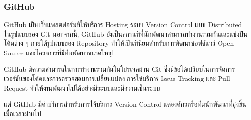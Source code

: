 \documentclass[12pt,oneside,openright,a4paper]{cpe-thai-project}
\begin{document}
        \subsubsection{GitHub}
            \begin{flushleft}
                GitHub เป็นเว็บแพลตฟอร์มที่ให้บริการ Hosting ระบบ Version Control แบบ Distributed ในรูปแบบของ Git นอกจากนี้, GitHub ยังเป็นสถานที่ที่นักพัฒนาสามารถทำงานร่วมกันและแบ่งปันโค้ดต่าง ๆ ภายใต้รูปแบบของ Repository ทำให้เป็นที่นิยมสำหรับการพัฒนาซอฟต์แวร์ Open Source และโครงการที่มีทีมพัฒนาขนาดใหญ่~\cite{github}
            \end{flushleft}
            \begin{flushleft}
                GitHub มีความสามารถในการทำงานร่วมกันในโปรเจคผ่าน Git ซึ่งมีข้อได้เปรียบในการจัดการเวอร์ชันของโค้ดและการตรวจสอบการเปลี่ยนแปลง การให้บริการ Issue Tracking และ Pull Request ทำให้งานพัฒนาไปได้อย่างมีระบบและมีความเป็นระบบ~\cite{github, chacon14}
            \end{flushleft}
            \begin{flushleft}
                แต่ GitHub มีค่าบริการสำหรับการให้บริการ Version Control แด่องค์กรหรือทีมนักพัฒนาที่สูงขึ้นเมื่อเวลาผ่านไป~\cite{githubprice}
            \end{flushleft}
\end{document}
